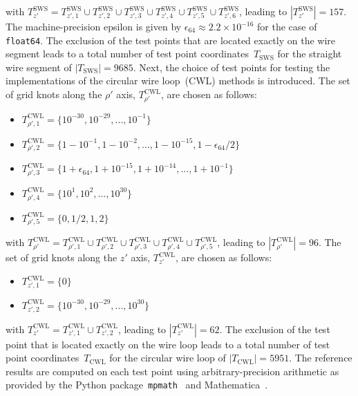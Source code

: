 with $T^\mathrm{SWS}_{z'} = T^\mathrm{SWS}_{z',1} \cup T^\mathrm{SWS}_{z',2} \cup T^\mathrm{SWS}_{z',3} \cup T^\mathrm{SWS}_{z',4} \cup T^\mathrm{SWS}_{z',5} \cup T^\mathrm{SWS}_{z',6}$,
leading to $|T^\mathrm{SWS}_{z'}| = 157$.
The machine-precision epsilon is given by $\epsilon_{64} \approx 2.2 \times 10^{-16}$ for the case of \texttt{float64}.
The exclusion of the test points that are located exactly on the wire segment leads to
a total number of test point coordinates~$T_\mathrm{SWS}$ for the straight wire segment of
$|T_\mathrm{SWS}| = 9685$.
Next, the choice of test points for testing the implementations
of the circular wire loop~(CWL) methods is introduced.
The set of grid knots along the $\rho'$ axis, $T^\mathrm{CWL}_{\rho'}$, are chosen as follows:
\begin{itemize}
  \item $T^\mathrm{CWL}_{\rho',1} = \{ 10^{-30}, 10^{-29}, ..., 10^{-1} \}$
  \item $T^\mathrm{CWL}_{\rho',2} = \{ 1 - 10^{-1}, 1 - 10^{-2}, ..., 1 - 10^{-15}, 1 - \epsilon_{64}/2 \}$
  \item $T^\mathrm{CWL}_{\rho',3} = \{ 1 + \epsilon_{64}, 1 + 10^{-15}, 1 + 10^{-14}, ..., 1 + 10^{-1} \}$
  \item $T^\mathrm{CWL}_{\rho',4} = \{ 10^{1}, 10^{2}, ..., 10^{30} \}$
  \item $T^\mathrm{CWL}_{\rho',5} = \{ 0, 1/2, 1, 2 \}$
\end{itemize}
with $T^\mathrm{CWL}_{\rho'} = T^\mathrm{CWL}_{\rho',1} \cup T^\mathrm{CWL}_{\rho',2} \cup T^\mathrm{CWL}_{\rho',3} \cup T^\mathrm{CWL}_{\rho',4} \cup T^\mathrm{CWL}_{\rho',5}$,
leading to $|T^\mathrm{CWL}_{\rho'}| = 96$.
The set of grid knots along the $z'$ axis, $T^\mathrm{CWL}_{z'}$, are chosen as follows:
\begin{itemize}
  \item $T^\mathrm{CWL}_{z',1} = \{ 0 \}$
  \item $T^\mathrm{CWL}_{z',2} = \{ 10^{-30}, 10^{-29}, ..., 10^{30} \}$
\end{itemize}
with $T^\mathrm{CWL}_{z'} = T^\mathrm{CWL}_{z',1} \cup T^\mathrm{CWL}_{z',2}$,
leading to $|T^\mathrm{CWL}_{z'}| = 62$.
The exclusion of the test point that is located exactly on the wire loop leads to
a total number of test point coordinates~$T_\mathrm{CWL}$ for the circular wire loop of
$|T_\mathrm{CWL}| = 5951$.
The reference results are computed on each test point using arbitrary-precision arithmetic
as provided by the Python package~\texttt{mpmath}~\cite{mpmath} and Mathematica~\cite{Mathematica}.
